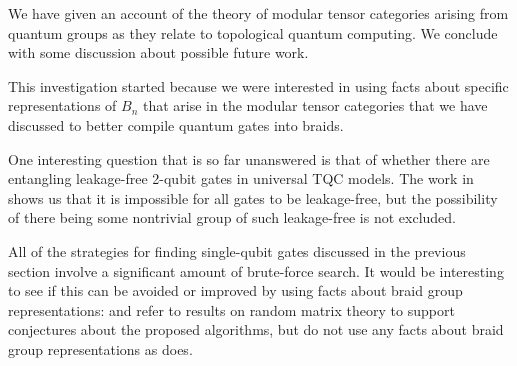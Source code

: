 We have given an account of the theory of modular tensor categories arising
from quantum groups as they relate to topological quantum computing. We
conclude with some discussion about possible future work. 

This investigation started because we were interested in using facts about
specific representations of $B_n$ that arise in the modular tensor categories
that we have discussed to better compile quantum gates into braids.
       
One interesting question that is so far unanswered is that of whether there are
entangling leakage-free 2-qubit gates in universal TQC models. The work in
\cite{Ainsworth2011} shows us that it is impossible for all gates to be
leakage-free, but the possibility of there being some nontrivial group of such
leakage-free is not excluded. 

All of the strategies for finding single-qubit gates discussed in the previous
section involve a significant amount of brute-force search. It would be
interesting to see if this can be avoided or improved by using facts about
braid group representations: \cite{Burrello2011} and \cite{Burrello2010} refer
to results on random matrix theory to support conjectures about the proposed
algorithms, but do not use any facts about braid group representations as
\cite{Ainsworth2011} does.
